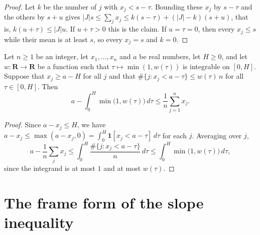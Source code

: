 \begin{proof}
Let $k$ be the number of $j$ with $x_j<s-\tau$. Bounding these $x_j$ by $s-\tau$ and the others
by $s+u$ gives $|J|s\leq\sum_jx_j\leq k(s-\tau)+(|J|-k)(s+u)$, that is,
$k(u+\tau)\leq|J|u$. If $u+\tau>0$ this is the claim. If $u=\tau=0$, then every $x_j\leq s$
while their mean is at least $s$, so every $x_j=s$ and $k=0$.
\end{proof}

\begin{lemma}\label{hs-layer-cake}
Let $n\geq1$ be an integer, let $x_1,\ldots,x_n$ and $a$ be real numbers, let $H\geq0$, and let
$w:\mathbf R\to\mathbf R$ be a function such that $\tau\mapsto\min(1,w(\tau))$ is integrable on
$[0,H]$. Suppose that $x_j\geq a-H$ for all $j$ and that
$\#\{j:x_j<a-\tau\}\leq w(\tau)\,n$ for all $\tau\in[0,H]$. Then
\[
 a-\int_0^H\min\big(1,w(\tau)\big)\,d\tau\leq\frac1n\sum_{j=1}^nx_j .
\]
\end{lemma}

\begin{proof}
Since $a-x_j\leq H$, we have
$a-x_j\leq\max(a-x_j,0)=\int_0^H\mathbf 1[x_j<a-\tau]\,d\tau$ for each $j$. Averaging over $j$,
\[
 a-\frac1n\sum_jx_j\leq\int_0^H\frac{\#\{j:x_j<a-\tau\}}n\,d\tau
 \leq\int_0^H\min\big(1,w(\tau)\big)\,d\tau,
\]
since the integrand is at most $1$ and at most $w(\tau)$.
\end{proof}

\section{The frame form of the slope inequality}\label{section-hs-frame-inequality}

